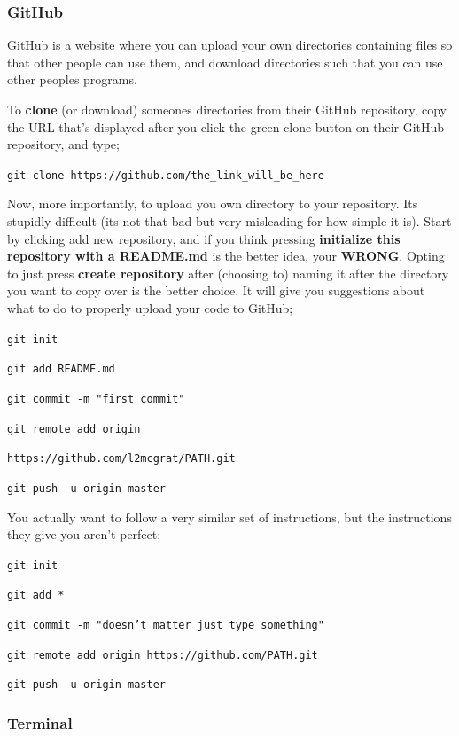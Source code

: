 \documentclass{article}
\begin{document}
\subsubsection{GitHub}

GitHub is a website where you can upload your own directories containing files so that other people can use them, and download directories such that you can use other peoples programs. 

To \textbf{clone} (or download) someones directories from their GitHub repository, copy the URL that's displayed after you click the green clone button on their GitHub repository, and type;

\texttt{git clone https://github.com/the\_link\_will\_be\_here}

Now, more importantly, to upload you own directory to your repository. Its stupidly difficult (its not that bad but very misleading for how simple it is). Start by clicking add new repository, and if you think pressing \textbf{initialize this repository with a README.md} is the better idea, your \textbf{WRONG}. Opting to just press \textbf{create repository} after (choosing to) naming it after the directory you want to copy over is the better choice. It will give you suggestions about what to do to properly upload your code to GitHub;

\texttt{git init}

\texttt{git add README.md}

\texttt{git commit -m "first commit"}

\texttt{git remote add origin}

\texttt{https://github.com/l2mcgrat/PATH.git}

\texttt{git push -u origin master}

You actually want to follow a very similar set of instructions, but the instructions they give you aren't perfect;

\texttt{git init}

\texttt{git add *}

\texttt{git commit -m "doesn't matter just type something"}

\texttt{git remote add origin https://github.com/PATH.git}

\texttt{git push -u origin master}



\subsubsection{Terminal}
\end{document}
